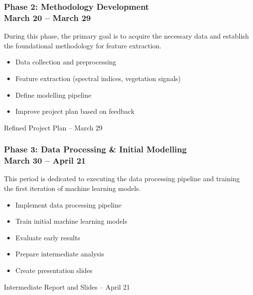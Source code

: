 \documentclass[12pt]{article}
\begin{document}
\subsubsection[Phase 2: Methodology Development]{Phase 2: Methodology Development \\ \normalsize March 20 – March 29}
During this phase, the primary goal is to acquire the necessary data and establish the foundational methodology for feature extraction.

\begin{description}[style=multiline, leftmargin=3cm, font=\normalfont\textbf]
    \item[Tasks:] 
    \begin{itemize}[nosep, leftmargin=*]
        \item Data collection and preprocessing
        \item Feature extraction (spectral indices, vegetation signals)
        \item Define modelling pipeline
        \item Improve project plan based on feedback
    \end{itemize}
    \item[Deliverable:] Refined Project Plan -- March 29
\end{description}

\subsubsection[Phase 3: Data Processing \& Initial Modelling]{Phase 3: Data Processing \& Initial Modelling \\ \normalsize March 30 – April 21}
This period is dedicated to executing the data processing pipeline and training the first iteration of machine learning models.

\begin{description}[style=multiline, leftmargin=3cm, font=\normalfont\textbf]
    \item[Tasks:] 
    \begin{itemize}[nosep, leftmargin=*]
        \item Implement data processing pipeline
        \item Train initial machine learning models
        \item Evaluate early results
        \item Prepare intermediate analysis
        \item Create presentation slides
    \end{itemize}
    \item[Deliverable:] Intermediate Report and Slides -- April 21
\end{description}
\end{document}

